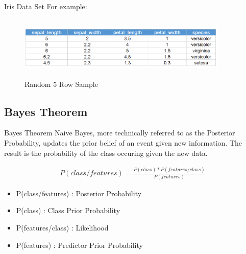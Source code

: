 \documentclass{beamer}
\begin{document}
    \begin{frame}{Iris Data Set}
        \hspace{0.5cm}For example:
        \begin{center}
            \begin{figure}
                \begin{center}
                     \includegraphics[width = 10cm, height = 3cm]{Theme/images/irisDataSet.png}
                \end{center}
                \caption{Random 5 Row Sample}
            \end{figure}
        \end{center}
    \end{frame}

\subsection{Bayes Theorem}
    \begin{frame}{Bayes Theorem}
        \hspace{0.5cm} Naive Bayes, more technically referred to as the Posterior Probability, updates the prior belief of an event given new information. The result is the probability of the class occuring given the new data.
        
        \begin{align*}
            P(class/features) = \frac{P(class) * P(features/class)}{P(features)}
        \end{align*}
        
        \begin{itemize}
            \item P(class/features) : Posterior Probability
            \item P(class) : Class Prior Probability
            \item P(features/class) : Likelihood
            \item P(features) : Predictor Prior Probability
        \end{itemize}
    \end{frame}
\end{document}
